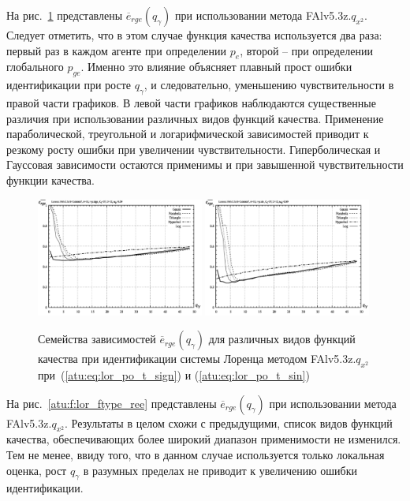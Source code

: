 На рис.~\ref{atu:f:lor_ftype_rge} представлены $\overline{e}_{rge}(q_\gamma)$ 
при использовании метода  FAlv5.3z.$q_{x^2}$.
Следует отметить, что в этом случае функция качества используется два раза:
первый раз в каждом агенте при определении $p_e$,
второй -- при определении глобального $p_{ge}$.
Именно это влияние объясняет плавный прост ошибки идентификации
при росте $q_\gamma$, и следовательно, уменьшению чувствительности в правой части графиков.
В левой части графиков наблюдаются существенные различия
при использовании различных видов функций качества.
Применение параболической, треугольной и логарифмической зависимостей
приводит к резкому росту ошибки при увеличении чувствительности.
Гиперболическая и Гауссовая зависимости остаются применимы и при
завышенной чувствительности функции качества.

\begin{figure}[h!]
  \centerline{
    \includegraphics[width=0.49\textwidth]{p/cha/lor/FAlv5.3z/f_type/lor_FAlv5_3z_qx2_Ft-p_qg_e_all_sign_rge.png}
    \hfill
    \includegraphics[width=0.49\textwidth]{p/cha/lor/FAlv5.3z/f_type/lor_FAlv5_3z_qx2_Ft-p_qg_e_all_sin_rge.png}
  }
  \caption{Семейства зависимостей $\overline{e}_{rge}(q_\gamma)$ для различных видов функций качества при идентификации системы Лоренца методом FAlv5.3z.$q_{x^2}$
   при~(\ref{atu:eq:lor_po_t_sign}) и (\ref{atu:eq:lor_po_t_sin})}
  \label{atu:f:lor_ftype_rge}
\end{figure}

На рис.~\ref{atu:f:lor_ftype_ree} представлены $\overline{e}_{rge}(q_\gamma)$
при использовании метода  FAlv5.3z.$q_{x^2}$.
Результаты в целом схожи с предыдущими, список видов функций качества, обеспечивающих
более широкий диапазон применимости не изменился. Тем не менее, ввиду того,
что в данном случае используется только локальная оценка, рост
$q_\gamma$ в разумных пределах не приводит к увеличению ошибки идентификации.

